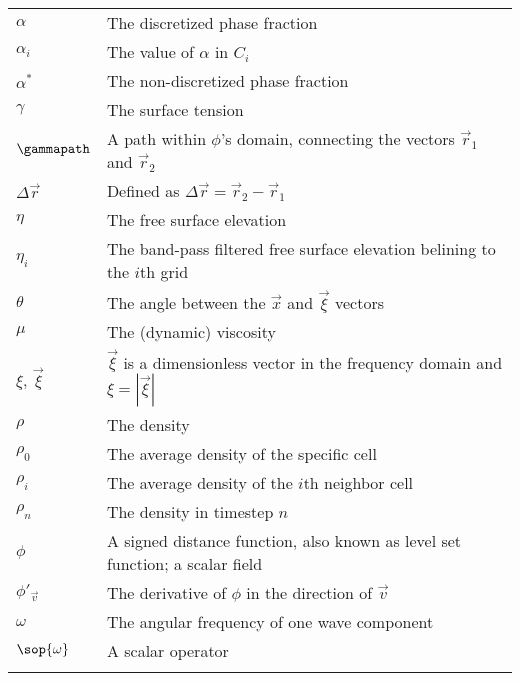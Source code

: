 {\begin{center}
\begin{longtabu}{l X}
    $\alpha$            & The discretized phase fraction \\
    $\alpha_i$          & The value of $\alpha$ in $C_i$ \\
    $\alpha^*$          & The non-discretized phase fraction \\
    $\gamma$            & The surface tension \\
    $\gammapath$        & A path within $\phi$'s domain, connecting the vectors
                          $\vec{r}_1$ and $\vec{r}_2$ \\
    $\Delta\vec{r}$     & Defined as $\Delta\vec{r} = \vec{r}_2 - \vec{r}_1$ \\
    $\eta$              & The free surface elevation \\
    $\eta_i$            & The band-pass filtered free surface elevation belining to the $i$th grid \\
    $\theta$            & The angle between the $\vec{x}$ and $\vec{\xi}$ vectors \\
    $\mu$               & The (dynamic) viscosity \\
    $\xi,\,\vec{\xi}$   & $\vec{\xi}$ is a dimensionless vector in the frequency domain
                          and $\xi = |\vec{\xi}|$ \\
    $\rho$              & The density \\
    $\rho_0$            & The average density of the specific cell \\
    $\rho_i$            & The average density of the $i$th neighbor cell \\
    $\rho_n$            & The density in timestep $n$ \\
    $\phi$              & A signed distance function, also known as level set function;
                          a scalar field \\
    $\phi'_{\vec{v}}$   & The derivative of $\phi$ in the direction of $\vec{v}$ \\
    $\omega$            & The angular frequency of one wave component \\
    $\sop{\omega}$      & A scalar operator \\
    
    \\
    

\end{longtabu}
\end{center}}
